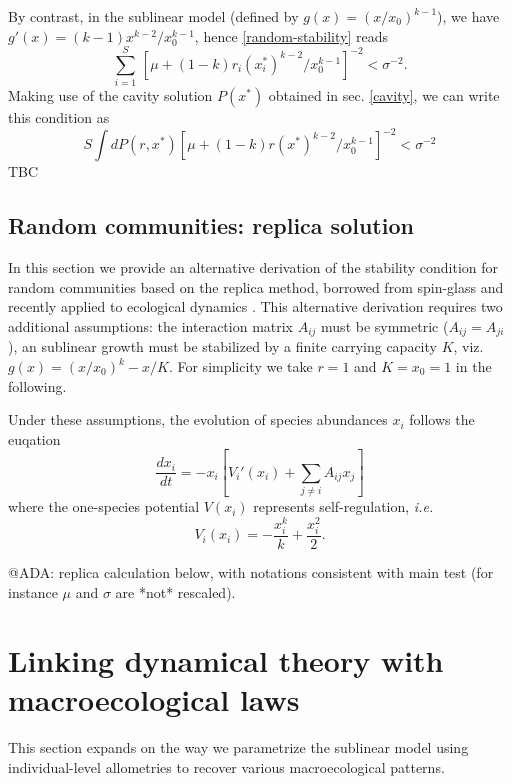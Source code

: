 \documentclass[12pt]{article}
\begin{document}
By contrast, in the sublinear model (defined by $g(x) = (x/x_0)^{k-1}$), we have $g'(x) = (k-1) x^{k-2}/x_0^{k-1}$, hence \eqref{random-stability} reads
\begin{equation}
    \sum_{i=1}^S\, [\mu + (1-k) r_i (x_i^*)^{k-2}/x_0^{k-1}]^{-2}< \sigma^{-2}.
\end{equation} 
Making use of the cavity solution $P(x^*)$ obtained in sec. \ref{cavity}, we can write this condition as 
\begin{equation}
    S \int dP(r, x^*)[\mu + (1-k) r (x^*)^{k-2}/x_0^{k-1}]^{-2}< \sigma^{-2}
\end{equation}
TBC

\subsection{Random communities: replica solution}

In this section we provide an alternative derivation of the stability condition for random communities based on the replica method, borrowed from spin-glass and recently applied to ecological dynamics \cite{biroli2018marginally, altieri2021properties}. This alternative derivation requires two additional assumptions: the interaction matrix $A_{ij}$ must be symmetric ($A_{ij} = A_{ji}$), an sublinear growth must be stabilized by a finite carrying capacity $K$, viz. $g(x) = (x/x_0)^k - x/K$. For simplicity we take $r=1$ and $K = x_0 = 1$ in the following.

Under these assumptions, the evolution of species abundances $x_i$ follows the euqation
\begin{equation}
    \frac{d x_i}{dt}= -x_i \left[V_i'(x_i) +\sum_{j \neq i} A_{ij} x_j \right] 
        \label{dynamical_eq}
\end{equation}
where the one-species potential $V(x_i)$ represents self-regulation, \emph{i.e.}
\begin{equation}
  V_i(x_i)= -\frac{x_i^k}{k}  +\frac{x_i^2}{2}.
\label{quadratic_potential}
\end{equation}


@ADA: replica calculation below, with notations consistent with main test (for instance $\mu$ and $\sigma$ are *not* rescaled). 


\section{Linking dynamical theory with macroecological laws}
This section expands on the way we parametrize the sublinear model using individual-level allometries to recover various macroecological patterns. 
\end{document}

